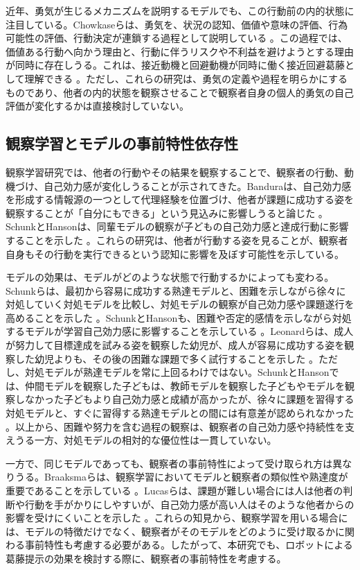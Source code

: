 \documentclass[utf8]{FrontiersinHarvard}
\begin{document}
近年、勇気が生じるメカニズムを説明するモデルでも、この行動前の内的状態に注目している。Chowkaseらは、勇気を、状況の認知、価値や意味の評価、行為可能性の評価、行動決定が連鎖する過程として説明している \citep{chowkase2024}。この過程では、価値ある行動へ向かう理由と、行動に伴うリスクや不利益を避けようとする理由が同時に存在しうる。これは、接近動機と回避動機が同時に働く接近回避葛藤として理解できる \citep{lewin1931,miller1944}。ただし、これらの研究は、勇気の定義や過程を明らかにするものであり、他者の内的状態を観察させることで観察者自身の個人的勇気の自己評価が変化するかは直接検討していない。

\subsection{観察学習とモデルの事前特性依存性}

観察学習研究では、他者の行動やその結果を観察することで、観察者の行動、動機づけ、自己効力感が変化しうることが示されてきた。Banduraは、自己効力感を形成する情報源の一つとして代理経験を位置づけ、他者が課題に成功する姿を観察することが「自分にもできる」という見込みに影響しうると論じた \citep{bandura1977}。SchunkとHansonは、同輩モデルの観察が子どもの自己効力感と達成行動に影響することを示した \citep{schunk1985}。これらの研究は、他者が行動する姿を見ることが、観察者自身もその行動を実行できるという認知に影響を及ぼす可能性を示している。

モデルの効果は、モデルがどのような状態で行動するかによっても変わる。Schunkらは、最初から容易に成功する熟達モデルと、困難を示しながら徐々に対処していく対処モデルを比較し、対処モデルの観察が自己効力感や課題遂行を高めることを示した \citep{schunk1987}。SchunkとHansonも、困難や否定的感情を示しながら対処するモデルが学習自己効力感に影響することを示している \citep{schunk1989}。Leonardらは、成人が努力して目標達成を試みる姿を観察した幼児が、成人が容易に成功する姿を観察した幼児よりも、その後の困難な課題で多く試行することを示した \citep{leonard2017}。ただし、対処モデルが熟達モデルを常に上回るわけではない。SchunkとHansonでは、仲間モデルを観察した子どもは、教師モデルを観察した子どもやモデルを観察しなかった子どもより自己効力感と成績が高かったが、徐々に課題を習得する対処モデルと、すぐに習得する熟達モデルとの間には有意差が認められなかった \citep{schunk1985}。以上から、困難や努力を含む過程の観察は、観察者の自己効力感や持続性を支えうる一方、対処モデルの相対的な優位性は一貫していない。

一方で、同じモデルであっても、観察者の事前特性によって受け取られ方は異なりうる。Braaksmaらは、観察学習においてモデルと観察者の類似性や熟達度が重要であることを示している \citep{braaksma2002}。Lucasらは、課題が難しい場合には人は他者の判断や行動を手がかりにしやすいが、自己効力感が高い人はそのような他者からの影響を受けにくいことを示した \citep{lucas2006}。これらの知見から、観察学習を用いる場合には、モデルの特徴だけでなく、観察者がそのモデルをどのように受け取るかに関わる事前特性も考慮する必要がある。したがって、本研究でも、ロボットによる葛藤提示の効果を検討する際に、観察者の事前特性を考慮する。
\end{document}
